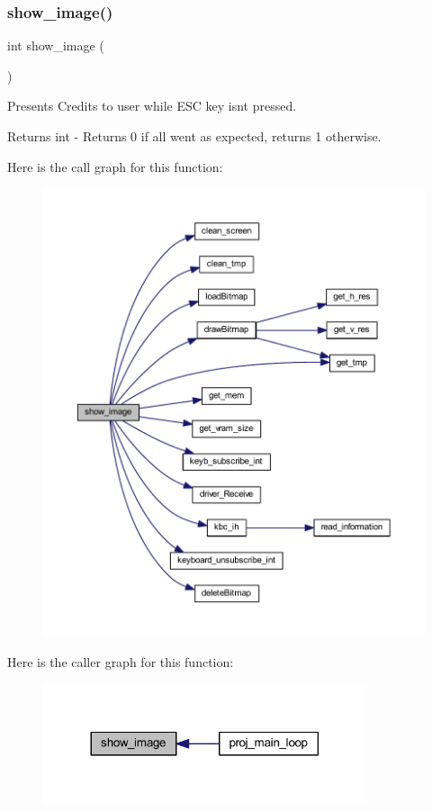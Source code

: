 \subsubsection{\texorpdfstring{show\+\_\+image()}{show\_image()}}
{\footnotesize\ttfamily int show\+\_\+image (\begin{DoxyParamCaption}{ }\end{DoxyParamCaption})}



Presents Credits to user while E\+SC key isn\textquotesingle{}t pressed. 

\begin{DoxyReturn}{Returns}
int -\/ Returns 0 if all went as expected, returns 1 otherwise. 
\end{DoxyReturn}
Here is the call graph for this function\+:
\nopagebreak
\begin{figure}[H]
\begin{center}
\leavevmode
\includegraphics[width=350pt]{group__credits_ga2d90e43cf8b9ee19d3dca31eb1c9cddd_cgraph}
\end{center}
\end{figure}
Here is the caller graph for this function\+:
\nopagebreak
\begin{figure}[H]
\begin{center}
\leavevmode
\includegraphics[width=269pt]{group__credits_ga2d90e43cf8b9ee19d3dca31eb1c9cddd_icgraph}
\end{center}
\end{figure}


